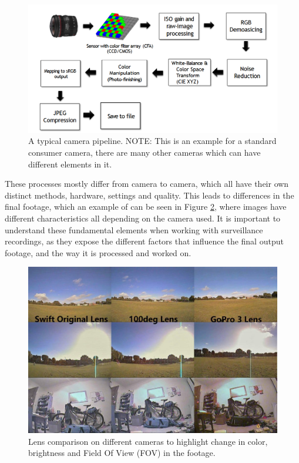 \begin{figure}[H]
    \centering
    \includegraphics[width=1\linewidth]{How_camera_works_pipeline.png}
    \caption{A typical camera pipeline.
    NOTE: This is an example for a standard consumer camera, there are many other cameras which can have different elements in it. }
    \label{fig:camera_pipeline}
\end{figure}
\noindent
These processes mostly differ from camera to camera, which all have their own distinct methods, hardware, settings and quality. This leads to differences in the final footage, which an example of can be seen in Figure \ref{fig:lens_comparison}, where images have different characteristics all depending on the camera used. It is important to understand these fundamental elements when working with surveillance recordings, as they expose the different factors that influence the final output footage, and the way it is processed and worked on\cite{korene_imatest2022_cv_iq}.
\begin{figure}[H]
    \centering
    \includegraphics[width=0.7\linewidth]{runcam-swift-lens-comparison.jpg}
    \caption{Lens comparison on different cameras to highlight change in color, brightness and Field Of View (\acs{FOV}) in the footage.}
    \label{fig:lens_comparison}
\end{figure}
